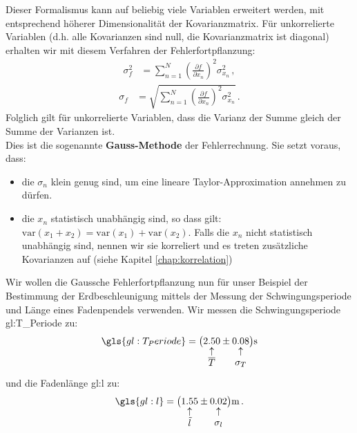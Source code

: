Dieser Formalismus kann auf beliebig viele Variablen erweitert werden, mit entsprechend höherer Dimensionalität der Kovarianzmatrix. Für unkorrelierte Variablen (d.h. alle Kovarianzen sind null, die Kovarianzmatrix ist diagonal) erhalten wir mit diesem Verfahren der Fehlerfortpflanzung:
\begin{align}
\sigma^2_f &= \sum^N_{n=1} \left( \frac{\partial f}{\partial x_n} \right)^2 \sigma^2_{x_n}\,,
\label{eq:GaussnD}
\end{align}
\begin{align}
\sigma_f &= \sqrt{ \sum^N_{n=1} \left( \frac{\partial f}{\partial x_n} \right)^2 \sigma^2_{x_n}}\,.
\label{eq:vl3-4}
\end{align}
Folglich gilt für unkorrelierte Variablen, dass die Varianz der Summe gleich der Summe der Varianzen ist.\\

Dies ist die sogenannte \textbf{Gauss-Methode} der Fehlerrechnung. Sie setzt voraus, dass:
\begin{itemize}
    \setlength\itemsep{0em}
        \item die $\sigma_n$ klein genug sind, um eine lineare Taylor-Approximation annehmen zu dürfen.
        \item die $x_n$ statistisch unabhängig sind, so dass gilt: $\text{var} ( x_1 + x_2 ) = \text{var} ( x_1 ) + \text{var} ( x_2 )$. Falls die $x_n$ nicht statistisch unabhängig sind, nennen wir sie korreliert und es treten zusätzliche Kovarianzen auf (siehe Kapitel \ref{chap:korrelation}) 
\end{itemize}

Wir wollen die Gaussche Fehlerfortpflanzung nun für unser Beispiel der Bestimmung der Erdbeschleunigung mittels der Messung der Schwingungsperiode  und Länge eines Fadenpendels verwenden. Wir messen die Schwingungsperiode \gls{gl:T_Periode}  zu:
\begin{align*}
\gls{gl:T_Periode} = \bigl( \underarrow[\text{2.50}][\uparrow]{\text{$\overline{T}$}} \pm \underarrow[\text{0.08}][\uparrow]{\text{$\sigma_T$}} \bigr) \text{s}
\end{align*}
und die Fadenlänge \gls{gl:l}  zu:
\begin{align*}
\gls{gl:l} = \bigl( \underarrow[\text{1.55}][\uparrow]{\text{$\Tilde{l}$}} \pm \underarrow[\text{0.02}][\uparrow]{\text{$\sigma_l$}} \bigr) \text{m}\,.
\end{align*}

